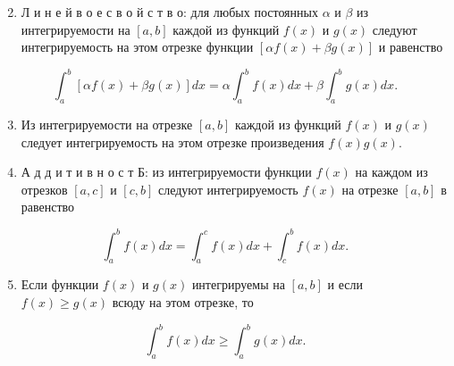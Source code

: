 \documentclass[10pt]{article}
\begin{document}
\begin{enumerate}

  \setcounter{enumi}{1}

  \item Л и н е й в о е с в о й с т в о: для любых постоянных $\alpha$ и $\beta$ из интегрируемости на $[a, b]$ каждой из функций $f(x)$ и $g(x)$ следуют интегрируемость на этом отрезке функции $[\alpha f(x)+\beta g(x)]$ и равенство

\end{enumerate}



\[

\int_{a}^{b}[\alpha f(x)+\beta g(x)] d x=\alpha \int_{a}^{b} f(x) d x+\beta \int_{a}^{b} g(x) d x .

\]



\begin{enumerate}

  \setcounter{enumi}{2}

  \item Из интегрируемости на отрезке $[a, b]$ каждой из функций $f(x)$ и $g(x)$ следует интегрируемость на этом отрезке произведения $f(x) g(x)$.



  \item А д д и т и в н о с т Б: из интегрируемости функции $f(x)$ на каждом из отрезков $[a, c]$ и $[c, b]$ следуют интегрируемость $f(x)$ на отрезке $[a, b]$ в равенство



\end{enumerate}



\[

\int_{a}^{b} f(x) d x=\int_{a}^{c} f(x) d x+\int_{c}^{b} f(x) d x .

\]



\begin{enumerate}

  \setcounter{enumi}{4}

  \item Если функции $f(x)$ и $g(x)$ интегрируемы на $[a, b]$ и если $f(x) \geqslant g(x)$ всюду на этом отрезке, то

\end{enumerate}



\[

\int_{a}^{b} f(x) d x \geqslant \int_{a}^{b} g(x) d x .

\]
\end{document}
